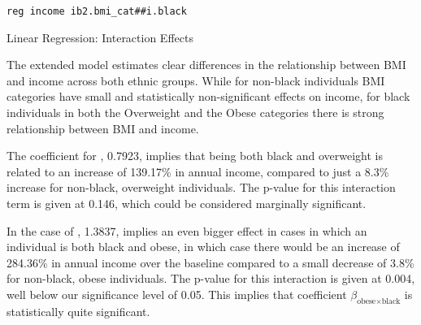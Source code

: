 \begin{verbatim}
reg income ib2.bmi_cat##i.black    
\end{verbatim}

\begin{table}[H]
    \begin{center}
        \caption{Linear Regression: Interaction Effects}
        
        \label{tab:reg4d}   
    \end{center}
\end{table}

The extended model estimates clear differences in the relationship between BMI and income across both ethnic groups. While for non-black individuals BMI categories have small and statistically non-significant effects on income, for black individuals in both the Overweight and the Obese categories there is strong relationship between BMI and income. 

The coefficient for , 0.7923, implies that being both black and overweight is related to an increase of 139.17\% in annual income, compared to just a 8.3\% increase for non-black, overweight individuals. The p-value for this interaction term is given at 0.146, which could be considered marginally significant.

In the case of , 1.3837, implies an even bigger effect in cases in which an individual is both black and obese, in which case there would be an increase of 284.36\% in annual income over the baseline compared to a small decrease of 3.8\% for non-black, obese individuals. The p-value for this interaction is given at 0.004, well below our significance level of 0.05. This implies that coefficient $\beta_{\text{obese} \times \text{black}}$ is statistically quite significant.